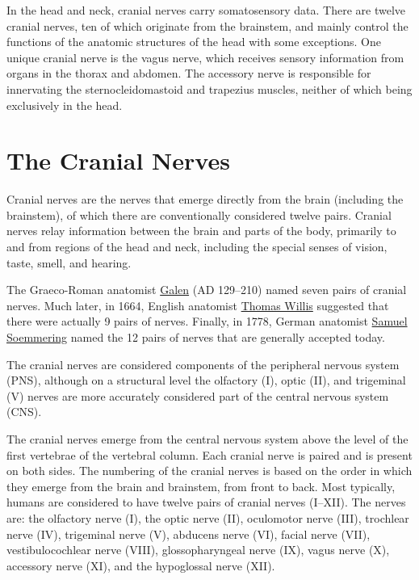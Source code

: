 In the head and neck, cranial nerves carry somatosensory data. There are twelve cranial nerves, ten of which originate from the brainstem, and mainly control the functions of the anatomic structures of the head with some exceptions. One unique cranial nerve is the vagus nerve, which receives sensory information from organs in the thorax and abdomen. The accessory nerve is responsible for innervating the sternocleidomastoid and trapezius muscles, neither of which being exclusively in the head.

\hypertarget{the-cranial-nerves}{%
\section{The Cranial Nerves}\label{the-cranial-nerves}}

Cranial nerves are the nerves that emerge directly from the brain (including the brainstem), of which there are conventionally considered twelve pairs. Cranial nerves relay information between the brain and parts of the body, primarily to and from regions of the head and neck, including the special senses of vision, taste, smell, and hearing.

The Graeco-Roman anatomist \href{https://en.wikipedia.org/wiki/Galen}{Galen} (AD 129--210) named seven pairs of cranial nerves. Much later, in 1664, English anatomist \href{https://en.wikipedia.org/wiki/Thomas_Willis}{Thomas Willis} suggested that there were actually 9 pairs of nerves. Finally, in 1778, German anatomist \href{https://en.wikipedia.org/wiki/Samuel_Thomas_von_Sömmerring}{Samuel Soemmering} named the 12 pairs of nerves that are generally accepted today.

The cranial nerves are considered components of the peripheral nervous system (PNS), although on a structural level the olfactory (I), optic (II), and trigeminal (V) nerves are more accurately considered part of the central nervous system (CNS).

The cranial nerves emerge from the central nervous system above the level of the first vertebrae of the vertebral column. Each cranial nerve is paired and is present on both sides. The numbering of the cranial nerves is based on the order in which they emerge from the brain and brainstem, from front to back. Most typically, humans are considered to have twelve pairs of cranial nerves (I--XII). The nerves are: the olfactory nerve (I), the optic nerve (II), oculomotor nerve (III), trochlear nerve (IV), trigeminal nerve (V), abducens nerve (VI), facial nerve (VII), vestibulocochlear nerve (VIII), glossopharyngeal nerve (IX), vagus nerve (X), accessory nerve (XI), and the hypoglossal nerve (XII).



